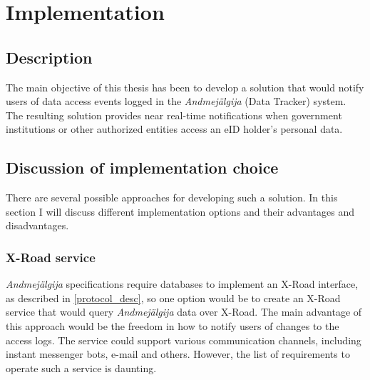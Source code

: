 \section{Implementation}

\subsection{Description}

The main objective of this thesis has been to develop a solution that would notify users of data access events logged in the \textit{Andmejälgija} (Data Tracker) system. The resulting solution provides near real-time notifications when government institutions or other authorized entities access an eID holder's personal data.

\subsection{Discussion of implementation choice}
There are several possible approaches for developing such a solution. In this section I will discuss different implementation options and their advantages and disadvantages.

\subsubsection{X-Road service}
\textit{Andmejälgija} specifications require databases to implement an X-Road interface, as described in \ref{protocol_desc}, so one option would be to create an X-Road service that would query \textit{Andmejälgija} data over X-Road. The main advantage of this approach would be the freedom in how to notify users of changes to the access logs. The service could support various communication channels, including instant messenger bots, e-mail and others. However, the list of requirements to operate such a service is daunting. 

